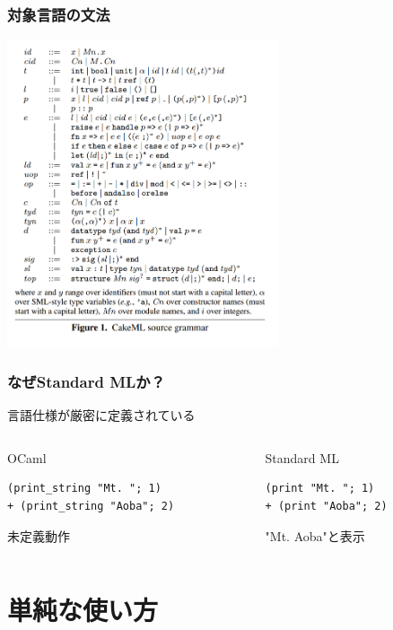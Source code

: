 \documentclass[dvipdfmx,cjk,xcolor=dvipsnames,envcountsect,notheorems,12pt]{beamer}
\theoremstyle{definition}
\begin{document}
\begin{frame}
	\frametitle{対象言語の文法}
	\includegraphics[width=80mm]{./syntax.png}
\end{frame}

\begin{frame}[fragile]
	\frametitle{なぜStandard MLか？}
	\Large
	言語仕様が厳密に定義されている
	\begin{columns}
		\begin{column}{0.6\textwidth}
			OCaml
			
			\vfill

\begin{lstlisting}
(print_string "Mt. "; 1)
+ (print_string "Aoba"; 2)
\end{lstlisting}

			\vfill

			未定義動作
		\end{column}
		\begin{column}{0.4\textwidth}
			Standard ML

			\vfill

\begin{lstlisting}
(print "Mt. "; 1)
+ (print "Aoba"; 2)
\end{lstlisting}

			\vfill

			"Mt. Aoba"と表示
		\end{column}
	\end{columns}
\end{frame}



\section{単純な使い方}
\end{document}
